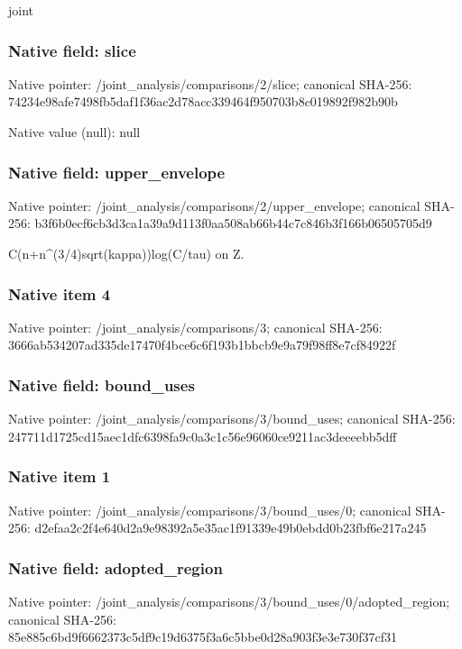 \documentclass[10pt,a4paper]{article}
\begin{document}
\begingroup\raggedright\sloppy joint\par\endgroup

\subsubsection{Native field: slice}
Native pointer: /joint\_\allowbreak{}analysis/comparisons/2/slice; canonical SHA-256: 74234e98afe7498fb5daf1f36ac2d78acc339464f950703b8c019892f982b90b

Native value (null): null

\subsubsection{Native field: upper\_\allowbreak{}envelope}
Native pointer: /joint\_\allowbreak{}analysis/comparisons/2/upper\_\allowbreak{}envelope; canonical SHA-256: b3f6b0ecf6cb3d3ca1a39a9d113f0aa508ab66b44c7c846b3f166b06505705d9

\begingroup\raggedright\sloppy C(n+n\textasciicircum{}(3/\allowbreak{}4)sqrt(kappa))log(C/\allowbreak{}tau) on Z.\par\endgroup

\subsubsection{Native item 4}
Native pointer: /joint\_\allowbreak{}analysis/comparisons/3; canonical SHA-256: 3666ab534207ad335de17470f4bce6c6f193b1bbcb9e9a79f98ff8e7cf84922f

\subsubsection{Native field: bound\_\allowbreak{}uses}
Native pointer: /joint\_\allowbreak{}analysis/comparisons/3/bound\_\allowbreak{}uses; canonical SHA-256: 247711d1725cd15aec1dfc6398fa9c0a3c1c56e96060ce9211ac3deeeebb5dff

\subsubsection{Native item 1}
Native pointer: /joint\_\allowbreak{}analysis/comparisons/3/bound\_\allowbreak{}uses/0; canonical SHA-256: d2efaa2c2f4e640d2a9e98392a5e35ac1f91339e49b0ebdd0b23fbf6e217a245

\subsubsection{Native field: adopted\_\allowbreak{}region}
Native pointer: /joint\_\allowbreak{}analysis/comparisons/3/bound\_\allowbreak{}uses/0/adopted\_\allowbreak{}region; canonical SHA-256: 85e885c6bd9f6662373c5df9c19d6375f3a6c5bbe0d28a903f3e3e730f37cf31
\end{document}
